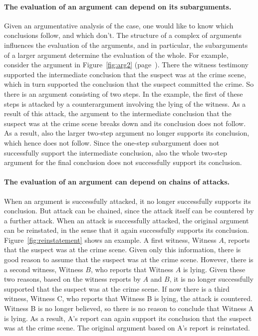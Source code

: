\documentclass[10pt]{article}
\begin{document}
\paragraph{The evaluation of an argument can depend on its subarguments.}Given an argumentative analysis of the case, one would like to know which conclusions follow, and which don't. 
The structure of a complex of arguments influences the evaluation of the arguments, and in particular, the subarguments of a larger argument determine the evaluation of the whole. 
For example, consider the argument in Figure~\ref{fig:arg2} (page~\pageref{fig:arg2}). There the witness testimony supported the intermediate conclusion that the suspect was at the crime scene, which in turn supported the conclusion that the suspect committed the crime. So there is an argument consisting of two steps. In the example, the first of these steps is attacked by a counterargument involving the lying of the witness. As a result of this attack, the argument to the intermediate conclusion that the suspect was at the crime scene breaks down and its conclusion does not follow. As a result, also the larger two-step argument no longer supports its conclusion, which hence does not follow. Since the one-step subargument does not successfully support the intermediate conclusion, also the whole two-step argument for the final conclusion does not successfully support its conclusion.

\paragraph{The evaluation of an argument can depend on chains of attacks.} When an argument is successfully attacked, it no longer successfully supports its conclusion. But attack can be chained, since the attack itself can be countered by a further attack. When an attack is successfully attacked, the original argument can be reinstated, in the sense that it again successfully supports its conclusion. Figure~\ref{fig:reinstatement} shows an example. A first witness, Witness $A$, reports that the suspect was at the crime scene. Given only this information, there is good reason to assume that the suspect was at the crime scene. However, there is a second witness, Witness $B$, who reports that Witness $A$ is lying. Given these two reasons, based on the witness reports by $A$ and $B$, it is no longer successfully supported that the suspect was at the crime scene. If now there is a third witness, Witness C, who reports that Witness B is lying, the attack is countered. Witness B is no longer believed, so there is no reason to conclude that Witness A is lying. As a result, A's report can again support its conclusion that the suspect was at the crime scene. The original argument based on A's report is reinstated. 
\end{document}
